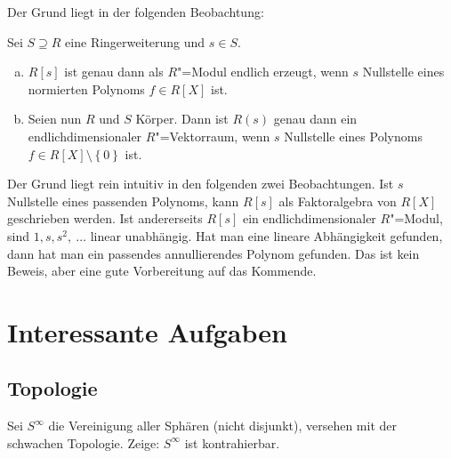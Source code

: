 \documentclass[ngerman, 11pt, a4paper, twoside, abstracton]{scrbook}
\begin{document}
Der Grund liegt in der folgenden Beobachtung:

\begin{pattern}
  Sei $S\supseteq R$ eine Ringerweiterung und $s\in S$.

  \begin{enumerate}[(a)]
    \item $R\left[ s \right]$ ist genau dann als $R$"=Modul endlich erzeugt, wenn $s$ Nullstelle eines normierten Polynoms $f\in R\left[ X \right]$ ist.
    \item Seien nun $R$ und $S$ Körper. Dann ist $R\left( s \right)$ genau dann ein endlichdimensionaler $R$"=Vektorraum, wenn $s$ Nullstelle eines Polynoms $f\in R\left[ X \right]\setminus\left\{ 0 \right\}$ ist.
  \end{enumerate}

\end{pattern}

Der Grund liegt rein intuitiv in den folgenden zwei Beobachtungen. Ist $s$ Nullstelle eines passenden Polynoms, kann $R\left[ s \right]$ als Faktoralgebra von $R\left[ X \right]$ geschrieben werden. Ist andererseits $R\left[ s \right]$ ein endlichdimensionaler $R$"=Modul, sind $1, s, s^2,\ \dots$ linear unabhängig. Hat man eine lineare Abhängigkeit gefunden, dann hat man ein passendes annullierendes Polynom gefunden. Das ist kein Beweis, aber eine gute Vorbereitung auf das Kommende.

\appendix

\chapter{Interessante Aufgaben}

\section{Topologie}

\begin{exercise}
  Sei $S^\infty$ die Vereinigung aller Sphären (nicht disjunkt), versehen mit der schwachen Topologie. Zeige: $S^\infty$ ist kontrahierbar.
\end{exercise}
\end{document}

